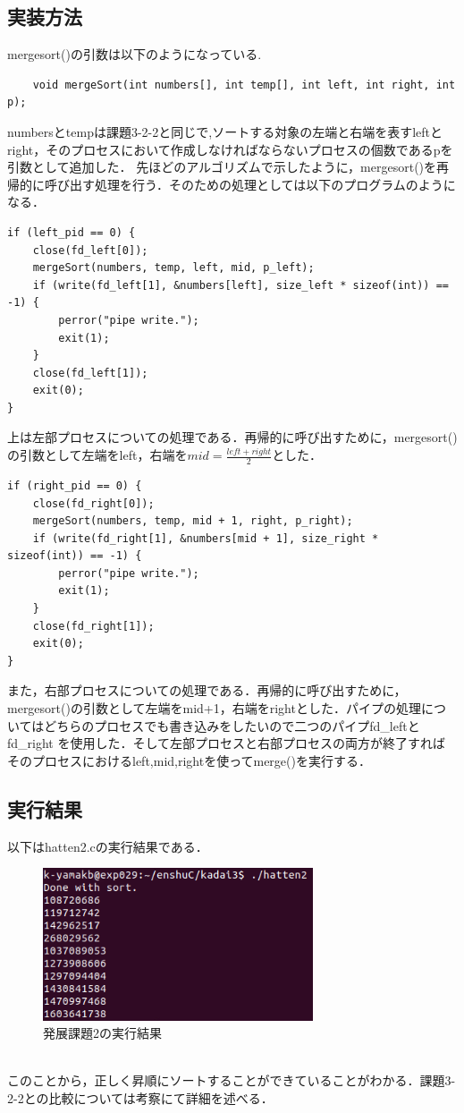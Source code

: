 \documentclass[dvipdfmx]{jarticle}
\begin{document}
\subsection{実装方法}
mergesort()の引数は以下のようになっている.
\begin{lstlisting}
    void mergeSort(int numbers[], int temp[], int left, int right, int p);
\end{lstlisting}
numbersとtempは課題3-2-2と同じで,ソートする対象の左端と右端を表すleftとright，そのプロセスにおいて作成しなければならないプロセスの個数であるpを引数として追加した．
先ほどのアルゴリズムで示したように，mergesort()を再帰的に呼び出す処理を行う．そのための処理としては以下のプログラムのようになる．
\begin{lstlisting}
if (left_pid == 0) {
    close(fd_left[0]);
    mergeSort(numbers, temp, left, mid, p_left);
    if (write(fd_left[1], &numbers[left], size_left * sizeof(int)) == -1) {
        perror("pipe write.");
        exit(1);
    }
    close(fd_left[1]);
    exit(0);
}
\end{lstlisting}
上は左部プロセスについての処理である．再帰的に呼び出すために，mergesort()の引数として左端をleft，右端を$mid = \frac{left+right}{2}$とした．
\begin{lstlisting}
if (right_pid == 0) {
    close(fd_right[0]);
    mergeSort(numbers, temp, mid + 1, right, p_right);
    if (write(fd_right[1], &numbers[mid + 1], size_right * sizeof(int)) == -1) {
        perror("pipe write.");
        exit(1);
    }
    close(fd_right[1]);
    exit(0);
}
\end{lstlisting}
また，右部プロセスについての処理である．再帰的に呼び出すために，mergesort()の引数として左端をmid+1，右端をrightとした．パイプの処理についてはどちらのプロセスでも書き込みをしたいので二つのパイプfd\_leftとfd\_right
を使用した．そして左部プロセスと右部プロセスの両方が終了すればそのプロセスにおけるleft,mid,rightを使ってmerge()を実行する．
\subsection{実行結果}
以下はhatten2.cの実行結果である．
\begin{figure}[h]
    \centering
    \includegraphics[width=8cm]{resulthatten2.png}
    \caption{発展課題2の実行結果}
\end{figure}
\\このことから，正しく昇順にソートすることができていることがわかる．課題3-2-2との比較については考察にて詳細を述べる．
\end{document}
